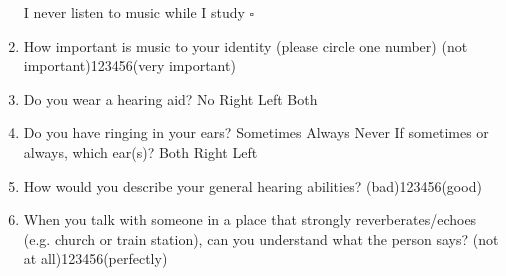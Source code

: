 \documentclass[12pt, a4paper]{article}
\begin{document}
\begin{enumerate}
\newline I never listen to music while I study $\square$
\item How important is music to your identity (please circle one number)
\newline (not important)\hspace{12pt}1\hspace{12pt}2\hspace{12pt}3\hspace{12pt}4\hspace{12pt}5\hspace{12pt}6\hspace{12pt}(very important) 
\item Do you wear a hearing aid?\hspace{6pt} No \hspace{6pt} Right \hspace{6pt} Left \hspace{6pt} Both
\item Do you have ringing in your ears?\hspace{6pt} Sometimes \hspace{6pt} Always \hspace{6pt} Never \hspace{6pt}
\newline If sometimes or always, which ear(s)?\hspace{6pt} Both \hspace{6pt} Right \hspace{6pt} Left \hspace{6pt}
\item How would you describe your general hearing abilities?
\newline (bad)\hspace{12pt}1\hspace{12pt}2\hspace{12pt}3\hspace{12pt}4\hspace{12pt}5\hspace{12pt}6\hspace{12pt}(good) 
\item  When you talk with someone in a place that strongly reverberates/echoes (e.g. church or train station), can you understand what the person says?
\newline (not at all)\hspace{12pt}1\hspace{12pt}2\hspace{12pt}3\hspace{12pt}4\hspace{12pt}5\hspace{12pt}6\hspace{12pt}(perfectly) 

\end{enumerate}
\end{document}
